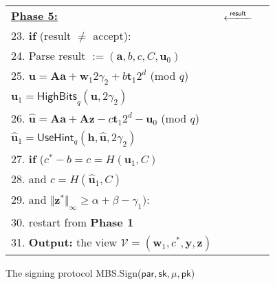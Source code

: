 \documentclass[conference]{IEEEtran}
\begin{document}
\begin{figure*}[pt]
\begin{tabular}{|  l c l | }
			\hline 
			\textbf{\underline{Phase 5:}}&$\xlongleftarrow{\textsf{        result      }}$&\\
			
			
			23. \textbf{if} (\textsf{result} $\neq$ \textsf{accept}): &&\\
			
			24.	\hspace{0.5cm} 	Parse \textsf{result} $:= (\mathbf{a}, b, c, C, \mathbf{u}_0)$ &&\\
			
			25.			\hspace{0.5cm}
			$\mathbf{u}=\mathbf{A}\mathbf{a}+\mathbf{w}_1 2\gamma_2+b\mathbf{t}_1 2^d$ (mod $q$)&&\\ 	\hspace{1.1cm}$\mathbf{u}_1=\textsf{HighBits}_q(\mathbf{u},2\gamma_2)$&&\\
			26.	\hspace{0.5cm} $\widehat{\mathbf{u}}=\mathbf{A}\mathbf{a}+\mathbf{A}\mathbf{z}-c\mathbf{t}_1 2^d-\mathbf{u}_0$ (mod $q$)&&\\ 
			\hspace{1cm}	$\widehat{\mathbf{u}}_1=\textsf{UseHint}_q(\mathbf{h},\widehat{\mathbf{u}}, 2\gamma_2)$&&\\ 
			
			27.		\hspace{0.5cm} \textbf{if} ($c^*-b=c=H(\mathbf{u}_1, C)$ &&\\
			28.		\hspace{1.2cm}  and $c=H(\widehat{\mathbf{u}}_1, C)$ &&\\
			29.		\hspace{1.2cm}  and $\Vert\mathbf{z}^* \Vert_{\infty} \geq \alpha+\beta-\gamma_1)$: &&\\
			
			30.		\hspace{1.8cm} restart from \textbf{Phase 1}&&\\
			31.		\textbf{Output:} the view $\mathcal{V}=(\mathbf{w}_1,c^*,\mathbf{y}, \mathbf{z})$&& \\
			\hline
		\end{tabular}
		
		\medskip
		\caption{The signing protocol \textsf{MBS.Sign}($\mathsf{par}, \textsf{sk},\mu, \textsf{pk}$)} 
		\label{fig1}
	\end{figure*}
	
	\fi
	
\end{document}
